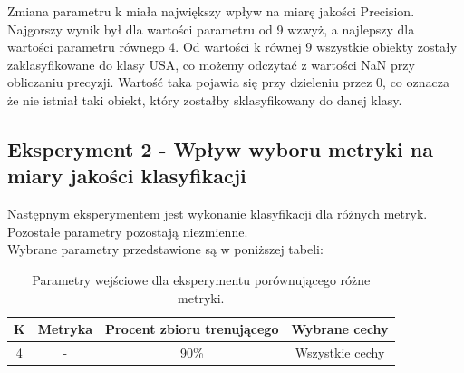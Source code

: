 \documentclass{classrep}
\begin{document}
Zmiana parametru k miała największy wpływ na miarę jakości Precision. Najgorszy wynik był dla wartości parametru od 9 wzwyż, a najlepszy dla wartości parametru równego 4. Od wartości k równej 9 wszystkie obiekty zostały zaklasyfikowane do klasy USA, co możemy odczytać z wartości NaN przy obliczaniu precyzji. Wartość taka pojawia się przy dzieleniu przez 0, co oznacza że nie istniał taki obiekt, który zostałby sklasyfikowany do danej klasy. \\



\subsection{Eksperyment 2 - Wpływ wyboru metryki na miary jakości klasyfikacji}
\label{subsection:ex2}
Następnym eksperymentem jest wykonanie klasyfikacji dla różnych metryk. Pozostałe parametry pozostają niezmienne.\\

Wybrane parametry przedstawione są w poniższej tabeli:
 
\begin{table}[h!]
\caption{Parametry wejściowe dla eksperymentu porównującego różne metryki. }
\centering
\vspace{0.1cm}
 \begin{tabular}{c c c c}
    \textbf{K} & \textbf{Metryka}   & \textbf{Procent zbioru trenującego}  & \textbf{Wybrane cechy}   \\
\hline
4 & - & 90\% &  Wszystkie cechy\\
\end {tabular}
\label {Parametry wejściowe dla eksperymentu porównującego różne metryki. }
\end{table}
\end{document}
